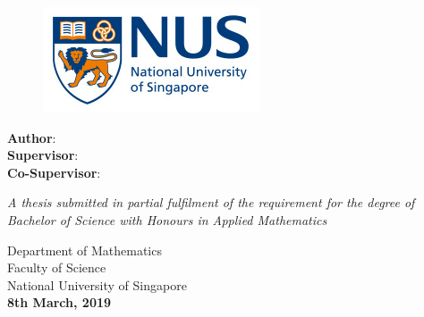 \makeatletter
\begin{titlepage}
    \begin{center}
        \vspace*{1cm}

        \begin{figure}[htbp]
             \centering
             \includegraphics[width=0.65\linewidth]{./Figures/fullcolorlogo.jpg}
        \end{figure}
        
        \Large
        \textbf{\@title}

        \vspace{1.5cm}
        
        \thesistype{}
        
        \vspace{1cm}

        \vspace{1cm}

        \large
        \textbf{Author}: \thesisauthor{} \\
        \large
        \textbf{Supervisor}: \supervisor{}\\
        \large
        \textbf{Co-Supervisor}: \cosupervisor{}
        \vspace{1.5cm}

\textit{        A thesis submitted in partial fulfilment of the requirement for the degree of
Bachelor of Science with Honours in Applied Mathematics}
        \vspace{1.5cm}
        
        \large
        Department of Mathematics\\
        Faculty of Science\\
        National University of Singapore\\

        \vspace{1cm}
        \textbf{8th March, 2019}

    \end{center}
\end{titlepage}
\makeatother